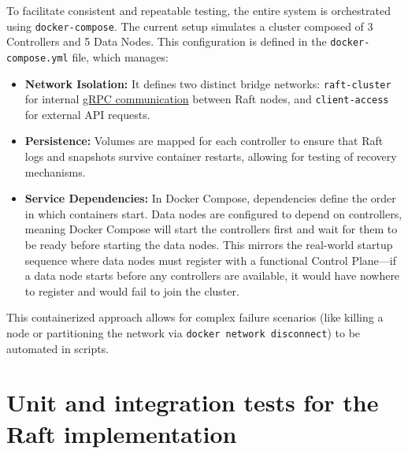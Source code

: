 \documentclass[shortabstract]{iithesis}
\begin{document}
To facilitate consistent and repeatable testing, the entire system is orchestrated using \texttt{docker-compose}. The current setup simulates a cluster composed of 3 Controllers and 5 Data Nodes. This configuration is defined in the \texttt{docker-compose.yml} file, which manages:
\begin{itemize}
    \item \textbf{Network Isolation:} It defines two distinct bridge networks: \texttt{raft-cluster} for internal \hyperref[def:rpc]{gRPC communication} between Raft nodes, and \texttt{client-access} for external API requests.
    \item \textbf{Persistence:} Volumes are mapped for each controller to ensure that Raft logs and snapshots survive container restarts, allowing for testing of recovery mechanisms.
    \item \textbf{Service Dependencies:} In Docker Compose, dependencies define the order in which containers start. Data nodes are configured to depend on controllers, meaning Docker Compose will start the controllers first and wait for them to be ready before starting the data nodes. This mirrors the real-world startup sequence where data nodes must register with a functional Control Plane—if a data node starts before any controllers are available, it would have nowhere to register and would fail to join the cluster.
\end{itemize}
This containerized approach allows for complex failure scenarios (like killing a node or partitioning the network via \texttt{docker network disconnect}) to be automated in scripts.

\section{Unit and integration tests for the Raft implementation}
\end{document}
